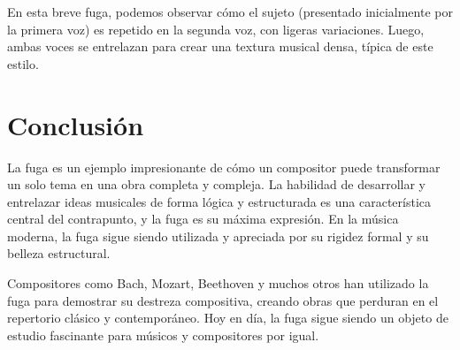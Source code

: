 
	En esta breve fuga, podemos observar cómo el sujeto (presentado inicialmente por la primera voz) es repetido en la segunda voz, con ligeras variaciones. Luego, ambas voces se entrelazan para crear una textura musical densa, típica de este estilo.

	\section{Conclusión}

	La fuga es un ejemplo impresionante de cómo un compositor puede transformar un solo tema en una obra completa y compleja. La habilidad de desarrollar y entrelazar ideas musicales de forma lógica y estructurada es una característica central del contrapunto, y la fuga es su máxima expresión. En la música moderna, la fuga sigue siendo utilizada y apreciada por su rigidez formal y su belleza estructural.

	Compositores como Bach, Mozart, Beethoven y muchos otros han utilizado la fuga para demostrar su destreza compositiva, creando obras que perduran en el repertorio clásico y contemporáneo. Hoy en día, la fuga sigue siendo un objeto de estudio fascinante para músicos y compositores por igual.


